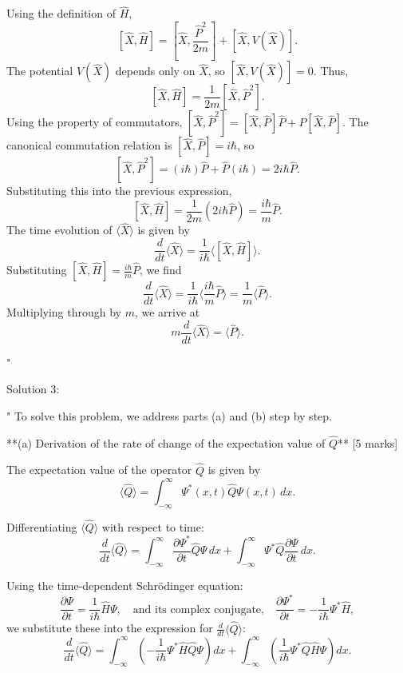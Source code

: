 Using the definition of $\hat{H}$,  
\[
[\hat{X}, \hat{H}] = \left[\hat{X}, \frac{\hat{P}^2}{2m} \right] + [\hat{X}, V(\hat{X})].
\]  
The potential $V(\hat{X})$ depends only on $\hat{X}$, so $[\hat{X}, V(\hat{X})] = 0$. Thus,  
\[
[\hat{X}, \hat{H}] = \frac{1}{2m} [\hat{X}, \hat{P}^2].
\]  
Using the property of commutators, $[\hat{X}, \hat{P}^2] = [\hat{X}, \hat{P}] \hat{P} + \hat{P} [\hat{X}, \hat{P}]$. The canonical commutation relation is $[\hat{X}, \hat{P}] = i\hbar$, so  
\[
[\hat{X}, \hat{P}^2] = (i\hbar) \hat{P} + \hat{P} (i\hbar) = 2i\hbar \hat{P}.
\]  
Substituting this into the previous expression,  
\[
[\hat{X}, \hat{H}] = \frac{1}{2m} (2i\hbar \hat{P}) = \frac{i\hbar}{m} \hat{P}.
\]  
The time evolution of $\langle \hat{X} \rangle$ is given by  
\[
\frac{d}{dt} \langle \hat{X} \rangle = \frac{1}{i\hbar} \langle [\hat{X}, \hat{H}] \rangle.
\]  
Substituting $[\hat{X}, \hat{H}] = \frac{i\hbar}{m} \hat{P}$, we find  
\[
\frac{d}{dt} \langle \hat{X} \rangle = \frac{1}{i\hbar} \langle \frac{i\hbar}{m} \hat{P} \rangle = \frac{1}{m} \langle \hat{P} \rangle.
\]  
Multiplying through by $m$, we arrive at  
\[
m \frac{d}{dt} \langle \hat{X} \rangle = \langle \hat{P} \rangle.
\]

"

Solution 3:

"
To solve this problem, we address parts (a) and (b) step by step.

**(a) Derivation of the rate of change of the expectation value of $\hat{Q}$** [5 marks]  

The expectation value of the operator $\hat{Q}$ is given by  
\[
\langle \hat{Q} \rangle = \int_{-\infty}^\infty \Psi^*(x, t) \hat{Q} \Psi(x, t) \, dx.
\]  

Differentiating $\langle \hat{Q} \rangle$ with respect to time:
\[
\frac{d}{dt} \langle \hat{Q} \rangle = \int_{-\infty}^\infty \frac{\partial \Psi^*}{\partial t} \hat{Q} \Psi \, dx + \int_{-\infty}^\infty \Psi^* \hat{Q} \frac{\partial \Psi}{\partial t} \, dx.
\]  

Using the time-dependent Schrödinger equation:
\[
\frac{\partial \Psi}{\partial t} = \frac{1}{i\hbar} \hat{H} \Psi, \quad \text{and its complex conjugate,} \quad \frac{\partial \Psi^*}{\partial t} = -\frac{1}{i\hbar} \Psi^* \hat{H},
\]
we substitute these into the expression for $\frac{d}{dt} \langle \hat{Q} \rangle$:  
\[
\frac{d}{dt} \langle \hat{Q} \rangle = \int_{-\infty}^\infty \left(-\frac{1}{i\hbar} \Psi^* \hat{H} \hat{Q} \Psi \right) dx + \int_{-\infty}^\infty \left(\frac{1}{i\hbar} \Psi^* \hat{Q} \hat{H} \Psi \right) dx.
\]  

